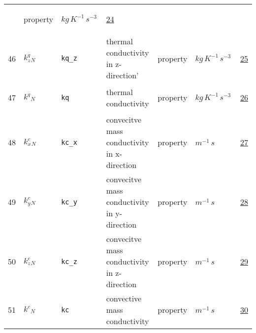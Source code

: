 \begin{longtable}{|p{1cm}|p{2.5cm}|p{4.5cm}|p{8cm}|p{3.0cm}|p{3cm}|p{1cm}|}
             & \begin{lay}property \end{lay}
             & $ kg \,K^{-1} \,s^{-3} \, $
             & \hyperlink{"e:24"}{ 24 }
                 \\
    46
             & \hypertarget{"v:46"}{ $ {{k^q_z}}{_{N}} $}
             & \verb|kq_z|
             & thermal conductivity in z-direction'
             & \begin{lay}property \end{lay}
             & $ kg \,K^{-1} \,s^{-3} \, $
             & \hyperlink{"e:25"}{ 25 }
                 \\
    47
             & \hypertarget{"v:47"}{ $ {{k^q}}{_{N}} $}
             & \verb|kq|
             & thermal conductivity
             & \begin{lay}property \end{lay}
             & $ kg \,K^{-1} \,s^{-3} \, $
             & \hyperlink{"e:26"}{ 26 }
                 \\
    48
             & \hypertarget{"v:48"}{ $ {{k^c_x}}{_{N}} $}
             & \verb|kc_x|
             & convecitve mass conductivity in x-direction
             & \begin{lay}property \end{lay}
             & $ m^{-1} \,s \, $
             & \hyperlink{"e:27"}{ 27 }
                 \\
    49
             & \hypertarget{"v:49"}{ $ {{k^c_y}}{_{N}} $}
             & \verb|kc_y|
             & convecitve mass conductivity in y-direction
             & \begin{lay}property \end{lay}
             & $ m^{-1} \,s \, $
             & \hyperlink{"e:28"}{ 28 }
                 \\
    50
             & \hypertarget{"v:50"}{ $ {{k^c_z}}{_{N}} $}
             & \verb|kc_z|
             & convecitve mass conductivity in z-direction
             & \begin{lay}property \end{lay}
             & $ m^{-1} \,s \, $
             & \hyperlink{"e:29"}{ 29 }
                 \\
    51
             & \hypertarget{"v:51"}{ $ {{k^c}}{_{N}} $}
             & \verb|kc|
             & convective mass conductivity
             & \begin{lay}property \end{lay}
             & $ m^{-1} \,s \, $
             & \hyperlink{"e:30"}{ 30 }

\end{longtable}
